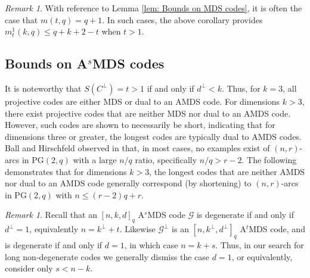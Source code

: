 \documentclass[11pt,a4paper]{amsart}
\newcommand{\AS}{ A$^s$MDS }
\newcommand{\G}{\mathcal{G}}
\theoremstyle{plain}
\theoremstyle{definition}
\theoremstyle{remark}
\newtheorem{remark}[theorem]{Remark}
\begin{document}
	\begin{remark}\label{rem: MDS Conj and AMDS t>1}
		With reference to Lemma \ref{lem: Bounds on MDS codes}, it is often the case that $m(t,q)=q+1$.  In such cases, the above corollary provides $m^1_t(k,q)\le q+k+2-t$ when $t>1$.
	\end{remark}

	\subsection{Bounds on \AS codes}

	It is noteworthy that $S(C^\perp) =t > 1$ if and only if $d^\perp < k$. Thus, for $k = 3$, all projective codes are either MDS or dual to an AMDS code. For dimensions $k > 3$, there exist projective codes that are neither MDS nor dual to an AMDS code. However, such codes are shown to necessarily be short, indicating that for dimensions three or greater, the longest codes are typically dual to AMDS codes.
	Ball and Hirschfeld observed in \cite{MR2158768} that, in most cases, no examples exist of  $(n, r)$-arcs in $\text{PG}(2, q)$ with a large $n/q$ ratio, specifically $n/q > r - 2$. The following demonstrates that for dimensions $k > 3$, the longest codes that are neither AMDS nor dual to an AMDS code generally correspond (by shortening) to $(n, r)$-arcs in $\text{PG}(2, q)$ with $n \leq (r - 2)q + r$.

	\begin{remark}
		Recall that an $[n,k,d]_q$ \AS code $\G$  is degenerate if and only if $d^\perp=1$, equivalently $n=k^\perp+t$.  Likewise $\G^\perp $ is an $[n,k^\perp,d^\perp]_q$ A$^t$MDS code, and is degenerate if and only if $d=1$, in which case $n=k+s$. Thus, in our search for long non-degenerate codes we generally dismiss the case $d=1$, or equivalently, consider only $s<n-k$.
	\end{remark}
\end{document}
